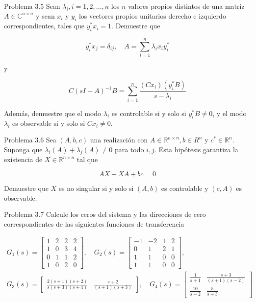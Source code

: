 Problema 3.5 Sean $\lambda_{i}, i=1,2, \ldots, n$ los $n$ valores propios distintos de una matriz $A \in \mathbb{C}^{n \times n}$ y sean $x_{i}$ y $y_{i}$ los vectores propios unitarios derecho e izquierdo correspondientes, tales que $y_{i}^{*} x_{i}=1$. Demuestre que

$$
y_{i}^{*} x_{j}=\delta_{i j}, \quad A=\sum_{i=1}^{n} \lambda_{i} x_{i} y_{i}^{*}
$$

y

$$
C(s I-A)^{-1} B=\sum_{i=1}^{n} \frac{\left(C x_{i}\right)\left(y_{i}^{*} B\right)}{s-\lambda_{i}}
$$

Además, demuestre que el modo $\lambda_{i}$ es controlable si y solo si $y_{i}^{*} B \neq 0$, y el modo $\lambda_{i}$ es observable si y solo si $C x_{i} \neq 0$.

Problema 3.6 Sea $(A, b, c)$ una realización con $A \in \mathbb{R}^{n \times n}, b \in R^{n}$ y $c^{*} \in \mathbb{R}^{n}$. Suponga que $\lambda_{i}(A)+\lambda_{j}(A) \neq 0$ para todo $i, j$. Esta hipótesis garantiza la existencia de $X \in \mathbb{R}^{n \times n}$ tal que

$$
A X+X A+b c=0
$$

Demuestre que $X$ es no singular si y solo si $(A, b)$ es controlable y $(c, A)$ es observable.

Problema 3.7 Calcule los ceros del sistema y las direcciones de cero correspondientes de las siguientes funciones de transferencia

$$
\begin{gathered}
G_{1}(s)=\left[\begin{array}{ll|ll}
1 & 2 & 2 & 2 \\
1 & 0 & 3 & 4 \\
\hline 0 & 1 & 1 & 2 \\
1 & 0 & 2 & 0
\end{array}\right], \quad G_{2}(s)=\left[\begin{array}{cc|cc}
-1 & -2 & 1 & 2 \\
0 & 1 & 2 & 1 \\
\hline 1 & 1 & 0 & 0 \\
1 & 1 & 0 & 0
\end{array}\right], \\
G_{3}(s)=\left[\begin{array}{ll}
\frac{2(s+1)(s+2)}{s(s+3)(s+4)} & \frac{s+2}{(s+1)(s+3)}
\end{array}\right], \quad G_{4}(s)=\left[\begin{array}{cc}
\frac{1}{s+1} & \frac{s+3}{(s+1)(s-2)} \\
\frac{10}{s-2} & \frac{5}{s+3}
\end{array}\right]
\end{gathered}
$$


